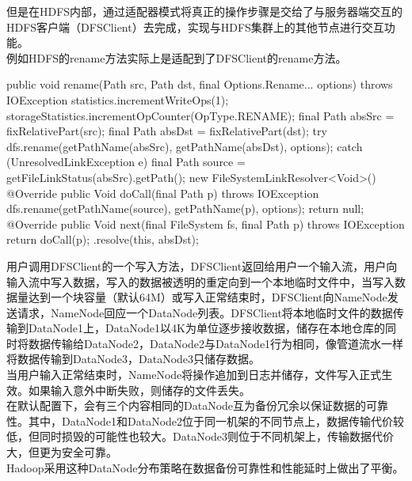        但是在HDFS内部，通过适配器模式将真正的操作步骤是交给了与服务器端交互的HDFS客户端（DFSClient）去完成，实现与HDFS集群上的其他节点进行交互功能。\\
        例如HDFS的rename方法实际上是适配到了DFSClient的rename方法。
        \begin{java}[caption=DistributedFileSystem.rename]
public void rename(Path src, Path dst, final Options.Rename... options) throws IOException {
    statistics.incrementWriteOps(1);
    storageStatistics.incrementOpCounter(OpType.RENAME);
    final Path absSrc = fixRelativePart(src);
    final Path absDst = fixRelativePart(dst);
    try {
        dfs.rename(getPathName(absSrc), getPathName(absDst), options);
    } catch (UnresolvedLinkException e) {
        final Path source = getFileLinkStatus(absSrc).getPath();
        new FileSystemLinkResolver<Void>() {
            @Override
            public Void doCall(final Path p) throws IOException {
                dfs.rename(getPathName(source), getPathName(p), options);
                return null;
            }
            @Override
            public Void next(final FileSystem fs, final Path p) throws IOException {
                return doCall(p);
            }
        }.resolve(this, absDst);
    }
}
        \end{java}
        用户调用DFSClient的一个写入方法，DFSClient返回给用户一个输入流，用户向输入流中写入数据，写入的数据被透明的重定向到一个本地临时文件中，当写入数据量达到一个块容量（默认64M）或写入正常结束时，DFSClient向NameNode发送请求，NameNode回应一个DataNode列表。DFSClient将本地临时文件的数据传输到DataNode1上，DataNode1以4K为单位逐步接收数据，储存在本地仓库的同时将数据传输给DataNode2，DataNode2与DataNode1行为相同，像管道流水一样将数据传输到DataNode3，DataNode3只储存数据。\\
        当用户输入正常结束时，NameNode将操作追加到日志并储存，文件写入正式生效。如果输入意外中断失败，则储存的文件丢失。\\
        在默认配置下，会有三个内容相同的DataNode互为备份冗余以保证数据的可靠性。其中，DataNode1和DataNode2位于同一机架的不同节点上，数据传输代价较低，但同时损毁的可能性也较大。DataNode3则位于不同机架上，传输数据代价大，但更为安全可靠。\\
        Hadoop采用这种DataNode分布策略在数据备份可靠性和性能延时上做出了平衡。
